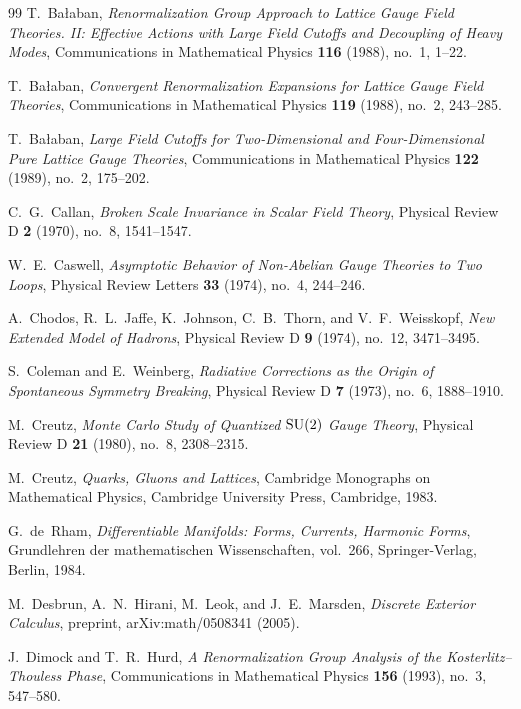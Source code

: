 \begin{thebibliography}{99}
T.~Ba{\l}aban,
\textit{Renormalization Group Approach to Lattice Gauge Field Theories. II: Effective Actions with Large Field Cutoffs and Decoupling of Heavy Modes},
Communications in Mathematical Physics \textbf{116} (1988), no.~1, 1--22.

T.~Ba{\l}aban,
\textit{Convergent Renormalization Expansions for Lattice Gauge Field Theories},
Communications in Mathematical Physics \textbf{119} (1988), no.~2, 243--285.

T.~Ba{\l}aban,
\textit{Large Field Cutoffs for Two-Dimensional and Four-Dimensional Pure Lattice Gauge Theories},
Communications in Mathematical Physics \textbf{122} (1989), no.~2, 175--202.

C.~G.~Callan,
\textit{Broken Scale Invariance in Scalar Field Theory},
Physical Review D \textbf{2} (1970), no.~8, 1541--1547.

W.~E.~Caswell,
\textit{Asymptotic Behavior of Non-Abelian Gauge Theories to Two Loops},
Physical Review Letters \textbf{33} (1974), no.~4, 244--246.

A.~Chodos, R.~L.~Jaffe, K.~Johnson, C.~B.~Thorn, and V.~F.~Weisskopf,
\textit{New Extended Model of Hadrons},
Physical Review D \textbf{9} (1974), no.~12, 3471--3495.

S.~Coleman and E.~Weinberg,
\textit{Radiative Corrections as the Origin of Spontaneous Symmetry Breaking},
Physical Review D \textbf{7} (1973), no.~6, 1888--1910.

M.~Creutz,
\textit{Monte Carlo Study of Quantized $\mathrm{SU}(2)$ Gauge Theory},
Physical Review D \textbf{21} (1980), no.~8, 2308--2315.

M.~Creutz,
\textit{Quarks, Gluons and Lattices},
Cambridge Monographs on Mathematical Physics, Cambridge University Press, Cambridge, 1983.

G.~de~Rham,
\textit{Differentiable Manifolds: Forms, Currents, Harmonic Forms},
Grundlehren der mathematischen Wissenschaften, vol.~266, Springer-Verlag, Berlin, 1984.

M.~Desbrun, A.~N.~Hirani, M.~Leok, and J.~E.~Marsden,
\textit{Discrete Exterior Calculus},
preprint, arXiv:math/0508341 (2005).

J.~Dimock and T.~R.~Hurd,
\textit{A Renormalization Group Analysis of the Kosterlitz--Thouless Phase},
Communications in Mathematical Physics \textbf{156} (1993), no.~3, 547--580.


\end{thebibliography}

